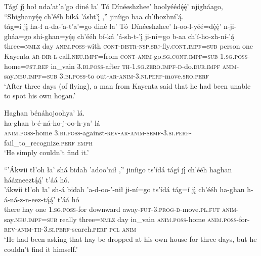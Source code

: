 \ea\label{ex:text9-11-5}
Tágí jį́ hoł nda’at’a’go diné ła’ Tó Dínéeshzhee’ hoolyéédę́ę́’ njigháago, ``Shighanyę́ę ch’ééh bíká ’ásht’į́ ,'' jiníigo baa ch’íhozhní’ą́.\\
\gll tág=í	jį́	ha-ł	n-da-’a-t’a’=go	diné	ła’	Tó~{Dínéeshzhee’}	h-oo-l-yéé=dę́ę́’	n-ji-gháa=go	shi-ghan=yę́ę	ch’ééh	bí-ká	’á-sh-t-’į́	ji-ní=go	b-aa	ch’í-ho-zh-ní-’ą́\\
     three=\textsc{nmlz}	day	\textsc{anim}.\textsc{poss}-with	\textsc{cont}-\textsc{distr}-\textsc{nsp}.\textsc{sbj}-fly.\textsc{cont}.\textsc{impf}=\textsc{sub}	person	one	Kayenta	\textsc{ar}-\textsc{dir}-\textsc{l}-call.\textsc{neu}.\textsc{impf}=from	\textsc{cont}-\textsc{anim}-go.\textsc{sg}.\textsc{cont}.\textsc{impf}=\textsc{sub}	1.\textsc{sg}.\textsc{poss}-home=\textsc{pst}.\textsc{ref}	in\_vain	3.\textsc{bi}.\textsc{poss}-after	\textsc{th}-1.\textsc{sg}.\textsc{zero}.\textsc{impf}-\textsc{d}-do.\textsc{dur}.\textsc{impf}	\textsc{anim}-say.\textsc{neu}.\textsc{impf}=\textsc{sub}	3.\textsc{bi}.\textsc{poss}-to	out-\textsc{ar}-\textsc{anim}-3.\textsc{ni}.\textsc{perf}-move.\textsc{sro}.\textsc{perf}\\
\glt `After three days (of flying), a man from Kayenta said that he had been unable to spot his own hogan.'
\z

\ea\label{ex:text9-11-6}
Haghan bénáhojoohya’ lá.\\
\gll ha-ghan	b-é-ná-ho-j-oo-h-ya’	lá\\
     \textsc{anim}.\textsc{poss}-home	3.\textsc{bi}.\textsc{poss}-against-\textsc{rev}-\textsc{ar}-\textsc{anim}-\textsc{semf}-3.\textsc{si}.\textsc{perf}-fail\_to\_recognize.\textsc{perf}	\textsc{emph}\\
\glt `He simply couldn't find it.'
\z

\ea\label{ex:text9-11-7}
``’Ákwii tł’oh ła’ shá bidah ’adoo’nił ,'' jiníigo ts’ídá tágí jį́ ch’ééh haghan háázneeztą́ą́’ t’áá hó.\\
\gll ’ákwii	tł’oh	ła’	sh-á	bidah	’a-d-oo-’-nił	ji-ní=go	ts’ídá	tág=í	jį́	ch’ééh	ha-ghan	h-á-ná-z-n-eez-tą́ą́’	t’áá	hó\\
     there	hay	one	1.\textsc{sg}.\textsc{poss}-for	downward	away-\textsc{fut}-3.\textsc{prog}-\textsc{d}-move.\textsc{pl}.\textsc{fut}	\textsc{anim}-say.\textsc{neu}.\textsc{impf}=\textsc{sub}	really	three=\textsc{nmlz}	day	in\_vain	\textsc{anim}.\textsc{poss}-home	\textsc{anim}.\textsc{poss}-for-\textsc{rev}-\textsc{anim}-\textsc{th}-3.\textsc{si}.\textsc{perf}-search.\textsc{perf}	\textsc{pcl}	\textsc{anim}\\
\glt `He had been asking that hay be dropped at his own house for three days, but he couldn't find it himself.'
\z

